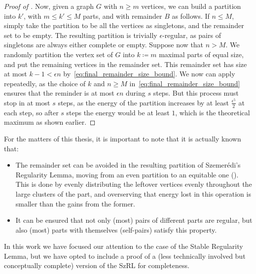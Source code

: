 \begin{proof}[Proof of ]
            Now, given a graph $G$ with $n \geq m$ vertices, we can build a partition into $k'$, with $m \leq k' \leq M$
            parts, and with remainder $B$ as follows.
            If $n \leq M$, simply take the partition to be all the vertices as singletons, and the remainder set to be empty.
            The resulting partition is trivially $\epsilon$-regular, as pairs of singletons are always either complete or empty.
            Suppose now that $n > M$.
            We randomly partition the vertex set of $G$ into $k \coloneqq m$ maximal parts of equal size, and put the remaining
            vertices in the remainder set.
            This remainder set has size at most $k - 1 < \epsilon n$ by~\eqref{eq:final_remainder_size_bound}.
            We now can apply  repeatedly,
            as the choice of $k$ and $n\geq M$ in~\eqref{eq:final_remainder_size_bound} ensures that the reminder is
            at most $\epsilon n$ during $s$ steps.
            But this process must stop in at most $s$ steps, as the energy of the partition increases by at least
            $\frac{\epsilon^5}{2}$ at each step, so after $s$ steps the energy would be at least $1$, which is the theoretical
            maximum as shown earlier.
        \end{proof}

        For the matters of this thesis, it is important to note that it is actually known that:
        \begin{itemize}
            \item \label{itm:regular_partition_with_no_remainder}
                The remainder set can be avoided in the resulting partition of Szemerédi's Regularity Lemma,
                moving from an even partition to an equitable one ().
                This is done by evenly distributing the leftover vertices evenly throughout the large clusters of the
                part, and overserving that energy lost in this operation is smaller than the gains from the former.
            \item \label{itm:regular_partition_with_regular_self_pairs}
                It can be ensured that not only (most) pairs of different parts are regular, but also (most) parts
                with themselves (self-pairs) satisfy this property.
        \end{itemize}

        In this work we have focused our attention to the case of the Stable Regularity Lemma, but we have opted to
        include a proof of a (less technically involved but conceptually complete) version of the SzRL for completeness.

